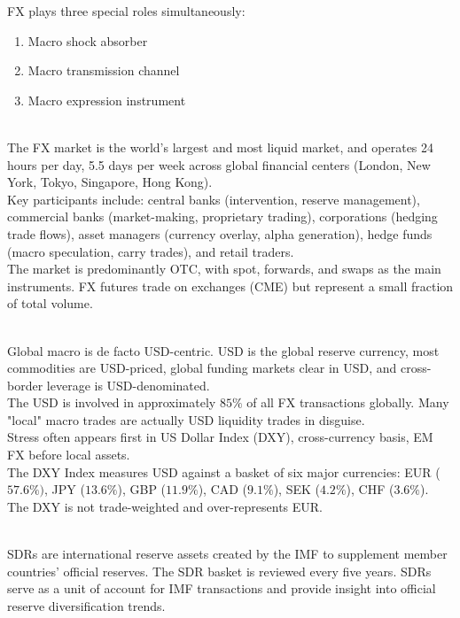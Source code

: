 \documentclass[a4paper,oneside,openany]{book}
\begin{document}
FX plays three special roles simultaneously:
\begin{enumerate}[label=\roman*.]
\setlength{\itemsep}{0pt}
\item Macro shock absorber 
\item Macro transmission channel 
\item Macro expression instrument
\end{enumerate}

\begin{remark} \\
The FX market is the world's largest and most liquid market, and operates 24 hours per day, 5.5 days per week across global financial centers (London, New York, Tokyo, Singapore, Hong Kong).\\
Key participants include: central banks (intervention, reserve management), commercial banks (market-making, proprietary trading), corporations (hedging trade flows), asset managers (currency overlay, alpha generation), hedge funds (macro speculation, carry trades), and retail traders.\\
The market is predominantly OTC, with spot, forwards, and swaps as the main instruments. FX futures trade on exchanges (CME) but represent a small fraction of total volume.
\end{remark}

\begin{remark} \\
Global macro is de facto USD-centric. USD is the global reserve currency, most commodities are USD-priced, global funding markets clear in USD, and cross-border leverage is USD-denominated.\\
The USD is involved in approximately $85\%$ of all FX transactions globally. Many "local" macro trades are actually USD liquidity trades in disguise.\\
Stress often appears first in US Dollar Index (DXY), cross-currency basis, EM FX before local assets.\\
The DXY Index measures USD against a basket of six major currencies: EUR ($57.6\%)$, JPY ($13.6\%$), GBP ($11.9\%$), CAD ($9.1\%$), SEK ($4.2\%$), CHF ($3.6\%$). The DXY is not trade-weighted and over-represents EUR.
\end{remark}

\begin{remark} \\
SDRs are international reserve assets created by the IMF to supplement member countries' official reserves. The SDR basket is reviewed every five years. SDRs serve as a unit of account for IMF transactions and provide insight into official reserve diversification trends.
\end{remark}
\end{document}
